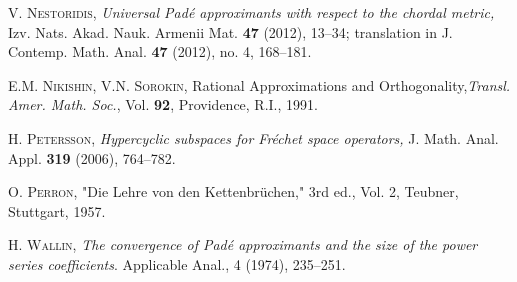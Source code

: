 \documentclass[12pt]{amsart}
\numberwithin{equation}{section}
\begin{document}
\begin{thebibliography}{99}
 \textsc{V. Nestoridis}, {\it Universal Pad\'e approximants with respect to the chordal metric,} Izv. Nats. Akad. Nauk. Armenii Mat. \textbf{47} (2012), 13--34; translation in J. Contemp. Math. Anal. \textbf{47} (2012), no. 4, 168--181.

 \textsc{E.M. Nikishin, V.N. Sorokin}, Rational Approximations and Orthogonality,{\em Transl. Amer. Math. Soc.}, Vol. {\bf 92}, Providence, R.I., 1991.
  
 \textsc{H. Petersson}, {\it Hypercyclic subspaces for Fr\'echet space operators,} J. Math. Anal. Appl. \textbf{319} (2006), 764--782.

 \textsc{O. Perron}, "Die Lehre von den Kettenbr\"uchen," 3rd ed., Vol. 2, Teubner, Stuttgart, 1957.

 \textsc{H. Wallin}, {\it The convergence of Pad\'e approximants and the size of the power series coefficients}. Applicable Anal., 4 (1974), 235--251.
\end{thebibliography}
\end{document}
